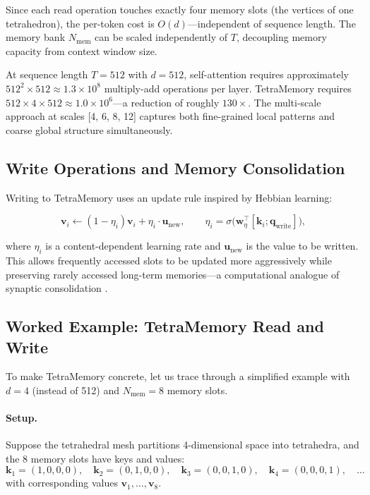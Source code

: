 Since each read operation touches exactly four memory slots (the vertices of one tetrahedron), the per-token cost is $O(d)$---independent of sequence length. The memory bank $N_{\mathrm{mem}}$ can be scaled independently of $T$, decoupling memory capacity from context window size.

\begin{implnote}
At sequence length $T = 512$ with $d = 512$, self-attention requires approximately $512^2 \times 512 \approx 1.3 \times 10^8$ multiply-add operations per layer. TetraMemory requires $512 \times 4 \times 512 \approx 1.0 \times 10^6$---a reduction of roughly $130\times$. The multi-scale approach at scales [4, 6, 8, 12] captures both fine-grained local patterns and coarse global structure simultaneously.
\end{implnote}

\subsection{Write Operations and Memory Consolidation}

Writing to TetraMemory uses an update rule inspired by Hebbian learning:

\begin{equation}
\mathbf{v}_i \leftarrow (1 - \eta_i) \mathbf{v}_i + \eta_i \cdot \mathbf{u}_{\mathrm{new}}, \qquad \eta_i = \sigma\bigl(\mathbf{w}_\eta^\top [\mathbf{k}_i; \mathbf{q}_{\mathrm{write}}]\bigr),
\label{eq:tetra-write}
\end{equation}

where $\eta_i$ is a content-dependent learning rate and $\mathbf{u}_{\mathrm{new}}$ is the value to be written. This allows frequently accessed slots to be updated more aggressively while preserving rarely accessed long-term memories---a computational analogue of synaptic consolidation \citep{mcclelland1995}.

\subsection{Worked Example: TetraMemory Read and Write}
\label{sec:tetramemory-example}

To make TetraMemory concrete, let us trace through a simplified example with $d = 4$ (instead of 512) and $N_{\mathrm{mem}} = 8$ memory slots.

\paragraph{Setup.} Suppose the tetrahedral mesh partitions 4-dimensional space into tetrahedra, and the 8 memory slots have keys and values:
\begin{equation*}
  \mathbf{k}_1 = (1,0,0,0), \quad \mathbf{k}_2 = (0,1,0,0), \quad \mathbf{k}_3 = (0,0,1,0), \quad \mathbf{k}_4 = (0,0,0,1), \quad \ldots
\end{equation*}
with corresponding values $\mathbf{v}_1, \ldots, \mathbf{v}_8$.

